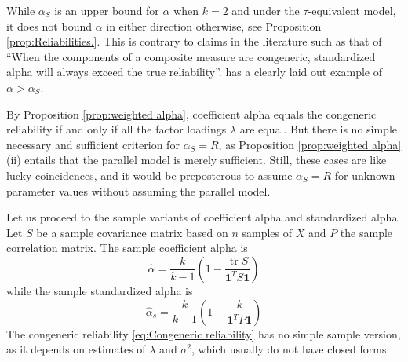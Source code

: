 \documentclass[twoside]{article}
\DeclareMathOperator{\tr}{tr}
\begin{document}
\begin{rem}
While $\alpha_S$ is an upper bound for $\alpha$ when $k = 2$ and under the $\tau$-equivalent model, it does not bound $\alpha$ in either direction otherwise, see Proposition \ref{prop:Reliabilities.}. This is contrary to claims in the literature such as that of \citet[][p.348]{Osburn2000-jd} \enquote{When the components of a composite measure are congeneric, standardized alpha will always exceed the true reliability}. \citet[][p.450]{Falk2011-ae} has a clearly laid out example of $\alpha>\alpha_S$.
\end{rem}




By Proposition \ref{prop:weighted alpha}, coefficient alpha equals the congeneric reliability if and only if all the factor loadings $\lambda$ are equal. But there is no simple necessary and sufficient criterion for $\alpha_S =  R$, as Proposition \ref{prop:weighted alpha} (ii) entails that the parallel model is merely sufficient. Still, these cases are like lucky coincidences, and it would be preposterous to assume $\alpha_S =  R$ for unknown parameter values without assuming the parallel model.

Let us proceed to the sample variants of coefficient alpha and standardized
alpha. Let $S$ be a sample covariance matrix based on
$n$ samples of $X$ and $P$ the sample correlation matrix.
The sample coefficient alpha is 
\begin{equation}
\hat{\alpha}=\frac{k}{k-1}\left(1-\frac{\tr{S}}{\boldsymbol{1}^{T}S\boldsymbol{1}}\right)\label{eq:sample coefficient alpha}
\end{equation}
while the sample standardized alpha is
\begin{equation}
\hat{\alpha}_s=\frac{k}{k-1}\left(1-\frac{k}{\boldsymbol{1}^{T}P\boldsymbol{1}}\right)\label{eq:sample standardized alpha}
\end{equation}
The congeneric reliability \eqref{eq:Congeneric reliability} has no
simple sample version, as it depends on estimates of $\lambda$ and
$\sigma^2$, which usually do not have closed forms.
\end{document}
